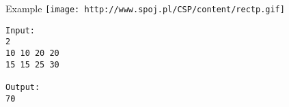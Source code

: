 Example
\texttt{[image: http://www.spoj.pl/CSP/content/rectp.gif]}
\begin{verbatim}
Input:
2
10 10 20 20
15 15 25 30

Output:
70
\end{verbatim}
